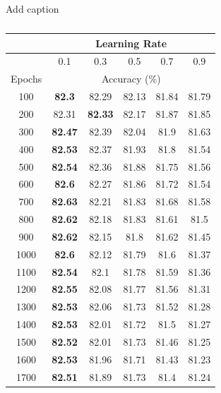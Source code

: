 \documentclass[12pt]{article}
\begin{document}
      \singlespacing
      \begin{table}[H]
        \centering
        \caption{Add caption}
        \begin{subtable}{.49\linewidth}
          \centering
          \caption{}
          \begin{tabular}{c|ccccc}
            \toprule
                  & \multicolumn{5}{c}{Learning Rate} \\
            \midrule
                  & \multicolumn{1}{c|}{0.1} & \multicolumn{1}{c|}{0.3} & \multicolumn{1}{c|}{0.5} & \multicolumn{1}{c|}{0.7} & 0.9 \\
            \midrule
            Epochs & \multicolumn{5}{c}{Accuracy (\%)} \\
            \midrule
            100   & \textbf{82.3} & 82.29 & 82.13 & 81.84 & 81.79 \\
            200   & 82.31 & \textbf{82.33} & 82.17 & 81.87 & 81.85 \\
            300   & \textbf{82.47} & 82.39 & 82.04 & 81.9  & 81.63 \\
            400   & \textbf{82.53} & 82.37 & 81.93 & 81.8  & 81.54 \\
            500   & \textbf{82.54} & 82.36 & 81.88 & 81.75 & 81.56 \\
            600   & \textbf{82.6} & 82.27 & 81.86 & 81.72 & 81.54 \\
            700   & \textbf{82.63} & 82.21 & 81.83 & 81.68 & 81.58 \\
            800   & \textbf{82.62} & 82.18 & 81.83 & 81.61 & 81.5 \\
            900   & \textbf{82.62} & 82.15 & 81.8  & 81.62 & 81.45 \\
            1000  & \textbf{82.6} & 82.12 & 81.79 & 81.6  & 81.37 \\
            1100  & \textbf{82.54} & 82.1  & 81.78 & 81.59 & 81.36 \\
            1200  & \textbf{82.55} & 82.08 & 81.77 & 81.56 & 81.31 \\
            1300  & \textbf{82.53} & 82.06 & 81.73 & 81.52 & 81.28 \\
            1400  & \textbf{82.53} & 82.01 & 81.72 & 81.5  & 81.27 \\
            1500  & \textbf{82.52} & 82.01 & 81.73 & 81.46 & 81.25 \\
            1600  & \textbf{82.53} & 81.96 & 81.71 & 81.43 & 81.23 \\
            1700  & \textbf{82.51} & 81.89 & 81.73 & 81.4  & 81.24 \\

\end{tabular}
\end{subtable}
\end{table}
\end{document}
